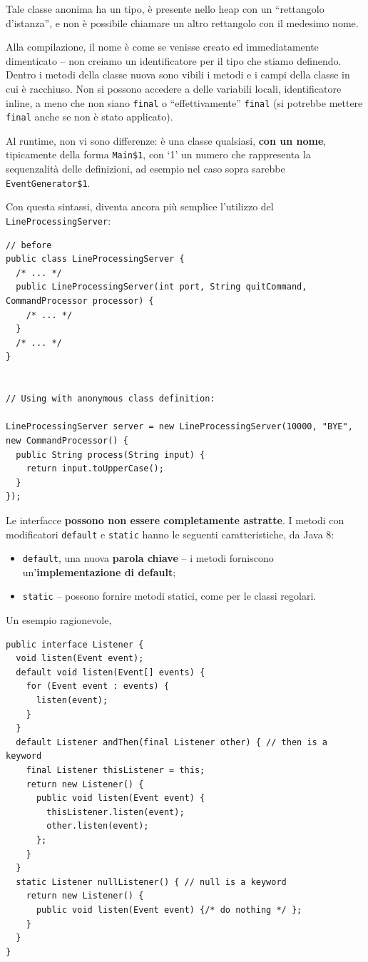 \documentclass[\fontsizeclass,twocolumn]{\classname}
\theoremstyle{definition}
\theoremstyle{definition}
\begin{document}
Tale classe anonima ha un tipo, è presente nello heap con un ``rettangolo
d'istanza'', e non è possibile chiamare un altro rettangolo con il medesimo
nome.

Alla compilazione, il nome è come se venisse creato ed immediatamente
dimenticato -- non creiamo un identificatore per il tipo che stiamo definendo.
Dentro i metodi della classe nuova sono vibili i metodi e i campi della classe
in cui è racchiuso. Non si possono accedere a delle variabili locali,
identificatore inline, a meno che non siano \texttt{final} o ``effettivamente''
\texttt{final} (si potrebbe mettere \texttt{final} anche se non è stato
applicato).

Al runtime, non vi sono differenze: è una classe qualsiasi, \textbf{con un
nome}, tipicamente della forma \texttt{Main\$1}, con `1' un numero che
rappresenta la sequenzalità delle definizioni, ad esempio nel caso sopra
sarebbe \texttt{EventGenerator\$1}.

Con questa sintassi, diventa ancora più semplice l'utilizzo del
\texttt{LineProcessing\-Server}:

\begin{lstlisting}
// before
public class LineProcessingServer {
  /* ... */
  public LineProcessingServer(int port, String quitCommand, CommandProcessor processor) {
    /* ... */
  }
  /* ... */
}


// Using with anonymous class definition:

LineProcessingServer server = new LineProcessingServer(10000, "BYE", new CommandProcessor() {
  public String process(String input) {
    return input.toUpperCase();
  }
});
\end{lstlisting}

Le interfacce \textbf{possono non essere completamente astratte}. I metodi con
modificatori \texttt{default} e \texttt{static} hanno le seguenti
caratteristiche, da Java 8:
\begin{itemize}
    \item \texttt{default}, una nuova \textbf{parola chiave} -- i metodi
        forniscono un'\textbf{implementazione di default};
    \item \texttt{static} -- possono fornire metodi statici, come per le classi
        regolari.
\end{itemize}

Un esempio ragionevole,

\begin{lstlisting}
public interface Listener {
  void listen(Event event);
  default void listen(Event[] events) {
    for (Event event : events) {
      listen(event);
    }
  }
  default Listener andThen(final Listener other) { // then is a keyword
    final Listener thisListener = this;
    return new Listener() {
      public void listen(Event event) {
        thisListener.listen(event);
        other.listen(event);
      };
    }
  }
  static Listener nullListener() { // null is a keyword
    return new Listener() {
      public void listen(Event event) {/* do nothing */ };
    }
  }
}
\end{lstlisting}
\end{document}

